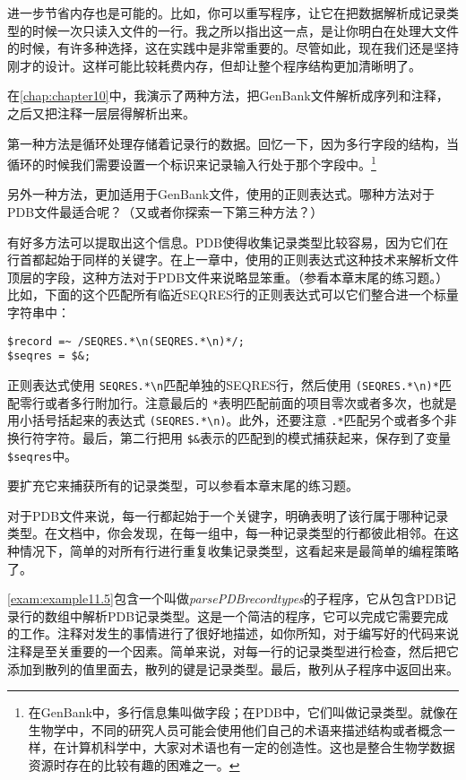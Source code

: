 进一步节省内存也是可能的。比如，你可以重写程序，让它在把数据解析成记录类型的时候一次只读入文件的一行。我之所以指出这一点，是让你明白在处理大文件的时候，有许多种选择，这在实践中是非常重要的。尽管如此，现在我们还是坚持刚才的设计。这样可能比较耗费内存，但却让整个程序结构更加清晰明了。

在\autoref{chap:chapter10}中，我演示了两种方法，把GenBank文件解析成序列和注释，之后又把注释一层层得解析出来。

第一种方法是循环处理存储着记录行的数据。回忆一下，因为多行字段的结构，当循环的时候我们需要设置一个标识来记录输入行处于那个字段中。\footnote{在GenBank中，多行信息集叫做字段；在PDB中，它们叫做记录类型。就像在生物学中，不同的研究人员可能会使用他们自己的术语来描述结构或者概念一样，在计算机科学中，大家对术语也有一定的创造性。这也是整合生物学数据资源时存在的比较有趣的困难之一。}

另外一种方法，更加适用于GenBank文件，使用的正则表达式。哪种方法对于PDB文件最适合呢？（又或者你探索一下第三种方法？）

有好多方法可以提取出这个信息。PDB使得收集记录类型比较容易，因为它们在行首都起始于同样的关键字。在上一章中，使用的正则表达式这种技术来解析文件顶层的字段，这种方法对于PDB文件来说略显笨重。（参看本章末尾的练习题。）比如，下面的这个匹配所有临近SEQRES行的正则表达式可以它们整合进一个标量字符串中：

\begin{lstlisting}
$record =~ /SEQRES.*\n(SEQRES.*\n)*/;
$seqres = $&;
\end{lstlisting}

正则表达式使用 \verb|SEQRES.*\n|匹配单独的SEQRES行，然后使用 \verb|(SEQRES.*\n)*|匹配零行或者多行附加行。注意最后的 \verb|*|表明匹配前面的项目零次或者多次，也就是用小括号括起来的表达式 \verb|(SEQRES.*\n)|。此外，还要注意 \verb|.*|匹配另个或者多个非换行符字符。最后，第二行把用 \verb|$&|表示的匹配到的模式捕获起来，保存到了变量 \verb|$seqres|中。

要扩充它来捕获所有的记录类型，可以参看本章末尾的练习题。

对于PDB文件来说，每一行都起始于一个关键字，明确表明了该行属于哪种记录类型。在文档中，你会发现，在每一组中，每一种记录类型的行都彼此相邻。在这种情况下，简单的对所有行进行重复收集记录类型，这看起来是最简单的编程策略了。

\autoref{exam:example11.5}包含一个叫做\textit{parsePDBrecordtypes}的子程序，它从包含PDB记录行的数组中解析PDB记录类型。这是一个简洁的程序，它可以完成它需要完成的工作。注释对发生的事情进行了很好地描述，如你所知，对于编写好的代码来说注释是至关重要的一个因素。简单来说，对每一行的记录类型进行检查，然后把它添加到散列的值里面去，散列的键是记录类型。最后，散列从子程序中返回出来。

